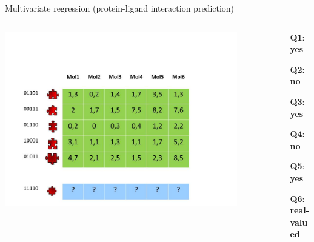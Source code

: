\documentclass[]{beamer}
\begin{document}
\begin{frame}
{Multivariate regression (protein-ligand interaction prediction)}

\begin{columns}

\begin{column}{9cm}
\includegraphics[width=0.9\textwidth,trim = 0 0 100 100,clip]{Figures/pictures/Slide1}
\end{column}

\begin{column}{7cm}
\begin{itemize}
\itemindent=2pt    \item [\textbf{Q1}:] \textbf{yes}
\itemindent=2pt    \item [\textbf{Q2}:] \textbf{no}
\itemindent=2pt    \item [\textbf{Q3}:] \textbf{yes}
\itemindent=2pt    \item [\textbf{Q4}:] \textbf{no}
\itemindent=2pt    \item [\textbf{Q5}:] \textbf{yes}
\itemindent=2pt    \item [\textbf{Q6}:]  \textbf{\color{red}real-valued}
\end{itemize}
\end{column}

\end{columns}
\end{frame}
\end{document}
